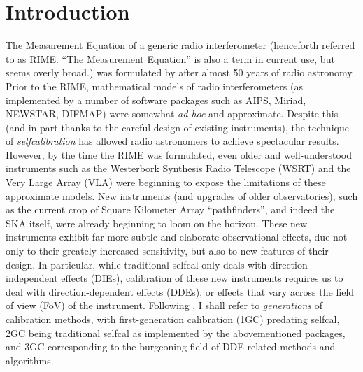 \documentclass[]{aa}
\begin{document}

\maketitle

\section*{Introduction}

The Measurement Equation of a generic radio interferometer (henceforth referred to as RIME. ``The Measurement Equation'' is also a term in current use, but seems overly broad.) was formulated by \citet{ME1} after almost 50 years of radio astronomy. Prior to the RIME, mathematical models of radio interferometers (as implemented by a number of software packages such as AIPS, Miriad, NEWSTAR, DIFMAP) were somewhat \emph{ad hoc} and approximate. Despite this (and in part thanks to the careful design of existing instruments), the technique of {\em selfcalibration} \citep{Cornwell:selfcal} has allowed radio astronomers to achieve spectacular results. However, by the time the RIME was formulated, even older and well-understood instruments such as the Westerbork Synthesis Radio Telescope (WSRT) and the Very Large Array (VLA) were beginning to expose the limitations of these approximate models. New instruments (and upgrades of older observatories), such as the current crop of Square Kilometer Array \citep{Schilizzi:SKA} ``pathfinders'', and indeed the SKA itself, were already beginning to loom on the horizon. These new instruments exhibit far more subtle and elaborate observational effects, due not only to their greately increased sensitivity, but also to new features of their design. In particular, while traditional selfcal only deals with direction-independent effects (DIEs), calibration of these new instruments requires us to deal with direction-dependent effects (DDEs), or effects that vary across the field of view (FoV) of the instrument. Following \citet{meqtrees}, I shall refer to \emph{generations} of calibration methods, with first-generation calibration (1GC) predating selfcal, 2GC being traditional selfcal as implemented by the abovementioned packages, and 3GC corresponding to the burgeoning field of DDE-related methods and algorithms. 
\end{document}
